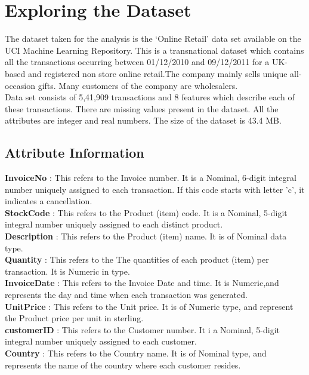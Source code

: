\section*{Exploring the Dataset}

The dataset taken for the analysis is the `Online Retail' data set available on the UCI Machine Learning Repository. This is a transnational dataset which contains all the transactions occurring between 01/12/2010 and 09/12/2011 for a UK-based and registered non store online retail.The company mainly sells unique all-occasion gifts. Many customers of the company are wholesalers.\\

Data set consists of 5,41,909 transactions and 8 features which describe each of these transactions. There are missing values present in the dataset. All the attributes are integer and real numbers. The size of the dataset is 43.4 MB.\\

\subsection{Attribute Information}

\textbf{InvoiceNo}    : This refers to the Invoice number. It is a Nominal, 6-digit integral number uniquely assigned to each transaction. If this code starts with letter 'c', it indicates a cancellation. \\
\textbf{StockCode}    : This refers to the Product (item) code. It is a Nominal, 5-digit integral number uniquely assigned to each distinct product.\\
\textbf{Description}  : This refers to the Product (item) name. It is of Nominal data type. \\
\textbf{Quantity}     : This refers to the The quantities of each product (item) per transaction. It is Numeric in type.\\
\textbf{InvoiceDate}  : This refers to the Invoice Date and time. It is Numeric,and represents the day and time when each transaction was generated. \\
\textbf{UnitPrice}    : This refers to the Unit price. It is of Numeric type, and represent the Product price per unit in sterling. \\
\textbf{customerID}   : This refers to the Customer number. It i a Nominal, 5-digit integral number uniquely assigned to each customer.\\
\textbf{Country}      : This refers to the Country name. It is of Nominal type, and represents the name of the country where each customer resides.\\

